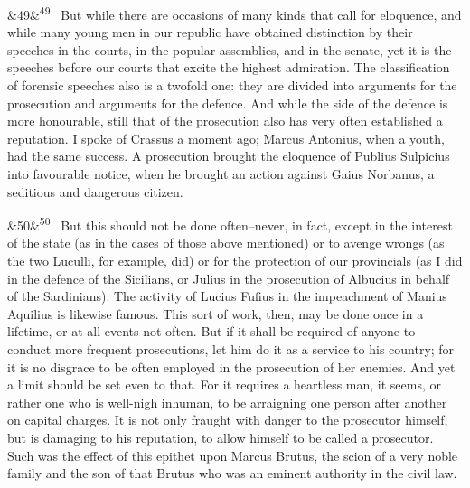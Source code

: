 \documentclass[12pt]{article}
\newcommand{\para}[1][]{\par\noindent\ifx&#1&\else\textsuperscript{\footnotesize #1}~\fi}
\begin{document}
\para[49] But while there are occasions of many kinds that call for eloquence, and while many young men in our republic have obtained distinction by their speeches in the courts, in the popular assemblies, and in the senate, yet it is the speeches before our courts that excite the highest admiration. The classification of forensic speeches also is a twofold one: they are divided into arguments for the prosecution and arguments for the defence. And while the side of the defence is more honourable, still that of the prosecution also has very often established a reputation. I spoke of Crassus a moment ago; Marcus Antonius, when a youth, had the same success. A prosecution brought the eloquence of Publius Sulpicius into favourable notice, when he brought an action against Gaius Norbanus, a seditious and dangerous citizen.

\para[50] But this should not be done often--never, in fact, except in the interest of the state (as in the cases of those above mentioned) or to avenge wrongs (as the two Luculli, for example, did) or for the protection of our provincials (as I did in the defence of the Sicilians, or Julius in the prosecution of Albucius in behalf of the Sardinians). The activity of Lucius Fufius in the impeachment of Manius Aquilius is likewise famous. This sort of work, then, may be done once in a lifetime, or at all events not often. But if it shall be required of anyone to conduct more frequent prosecutions, let him do it as a service to his country; for it is no disgrace to be often employed in the prosecution of her enemies. And yet a limit should be set even to that. For it requires a heartless man, it seems, or rather one who is well-nigh inhuman, to be arraigning one person after another on capital charges. It is not only fraught with danger to the prosecutor himself, but is damaging to his reputation, to allow himself to be called a prosecutor. Such was the effect of this epithet upon Marcus Brutus, the scion of a very noble family and the son of that Brutus who was an eminent authority in the civil law.
\end{document}
